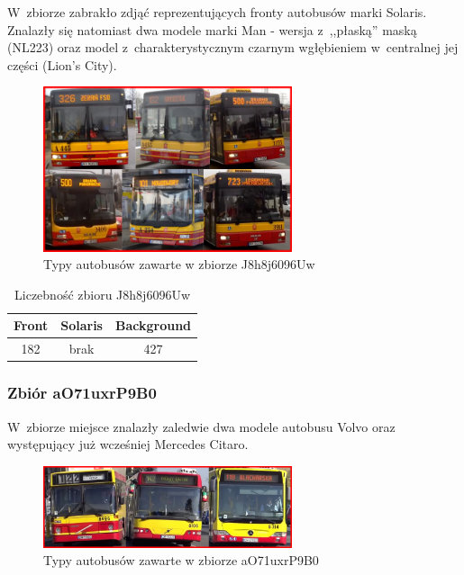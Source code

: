 W~zbiorze zabrakło zdjąć reprezentujących fronty autobusów marki
Solaris. Znalazły się natomiast dwa modele marki Man - wersja 
z~,,płaską'' maską (NL223) oraz model z~charakterystycznym czarnym
wgłębieniem w~centralnej jej części (Lion's City).

\begin{figure}[!h]
    \centering
    \includegraphics[width=0.65\textwidth]{img/exp_trainig_data_J8h}
    \caption{Typy autobusów zawarte w zbiorze J8h8j6096Uw}
    \label{fig:J8h8j6096Uw_types}
\end{figure}

\begin{table}[!h]
    \centering
    \begin{tabular}{c|c|c}
        Front   & Solaris   & Background \\ \hline
        182     & brak      & 427 
    \end{tabular}
    \caption{Liczebność zbioru J8h8j6096Uw}
    \label{tab:J8h8j6096Uw_count}
\end{table}

\subsubsection{Zbiór aO71uxrP9B0}

W~zbiorze miejsce znalazły zaledwie dwa modele autobusu Volvo oraz
występujący już wcześniej Mercedes Citaro.

\begin{figure}[!h]
    \centering
    \includegraphics[width=0.65\textwidth]{img/exp_trainig_data_aO7}
    \caption{Typy autobusów zawarte w zbiorze aO71uxrP9B0}
    \label{fig:aO71uxrP9B0_types}
\end{figure}

